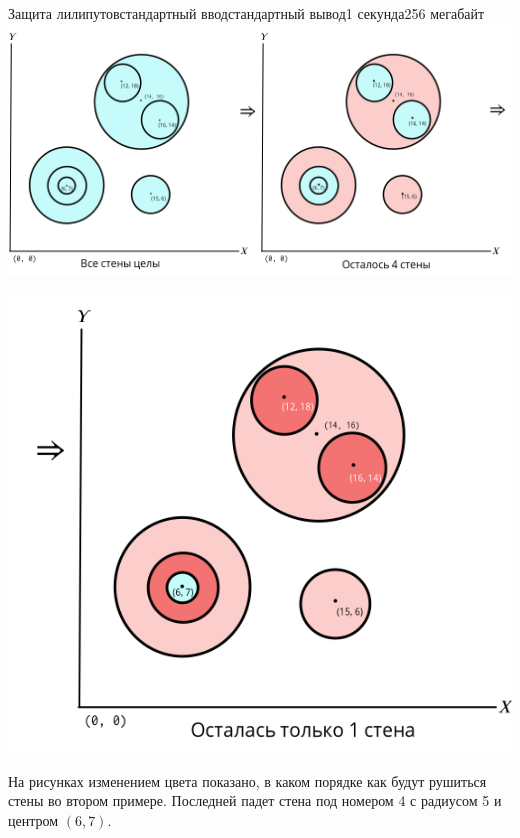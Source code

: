 \begin{problem}{Защита лилипутов}{стандартный ввод}{стандартный вывод}{1 секунда}{256 мегабайт}
\Note
\includegraphics[width=\textwidth]{sample2a.png}\\
\strut\hfill\includegraphics[width=.55\textwidth]{sample2b.png}\hspace{3mm}\strut

\noindent На рисунках изменением цвета показано, в каком порядке как будут рушиться стены во втором примере. Последней падет стена под номером 4 с радиусом 5 и центром $(6, 7)$.

\end{problem}

